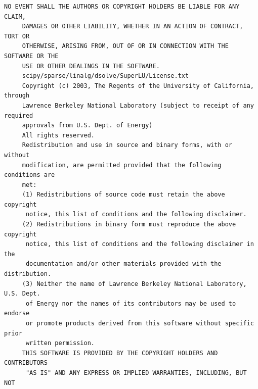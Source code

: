 \begin{lstlisting}[basicstyle=\ttfamily\footnotesize,breaklines=true]
     NO EVENT SHALL THE AUTHORS OR COPYRIGHT HOLDERS BE LIABLE FOR ANY CLAIM,
     DAMAGES OR OTHER LIABILITY, WHETHER IN AN ACTION OF CONTRACT, TORT OR
     OTHERWISE, ARISING FROM, OUT OF OR IN CONNECTION WITH THE SOFTWARE OR THE
     USE OR OTHER DEALINGS IN THE SOFTWARE.
     scipy/sparse/linalg/dsolve/SuperLU/License.txt
     Copyright (c) 2003, The Regents of the University of California, through
     Lawrence Berkeley National Laboratory (subject to receipt of any required
     approvals from U.S. Dept. of Energy)
     All rights reserved.
     Redistribution and use in source and binary forms, with or without
     modification, are permitted provided that the following conditions are
     met:
     (1) Redistributions of source code must retain the above copyright
      notice, this list of conditions and the following disclaimer.
     (2) Redistributions in binary form must reproduce the above copyright
      notice, this list of conditions and the following disclaimer in the
      documentation and/or other materials provided with the distribution.
     (3) Neither the name of Lawrence Berkeley National Laboratory, U.S. Dept.
      of Energy nor the names of its contributors may be used to endorse
      or promote products derived from this software without specific prior
      written permission.
     THIS SOFTWARE IS PROVIDED BY THE COPYRIGHT HOLDERS AND CONTRIBUTORS
      "AS IS" AND ANY EXPRESS OR IMPLIED WARRANTIES, INCLUDING, BUT NOT





\end{lstlisting}
